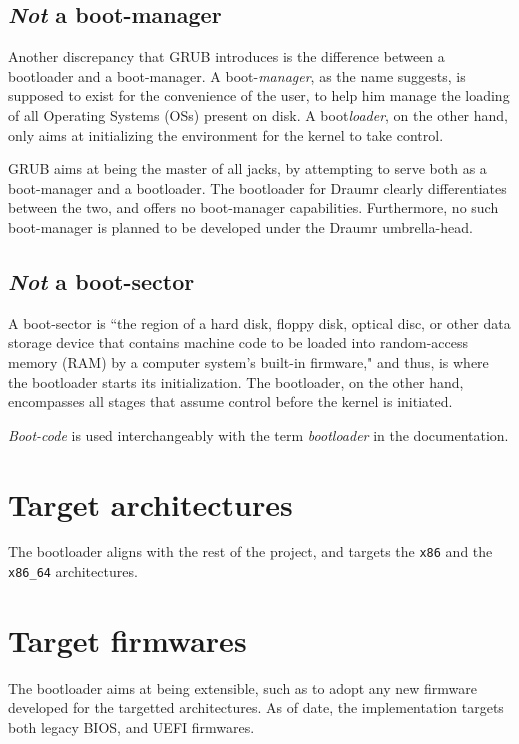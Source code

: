 \documentclass[a4paper,oneside]{memoir}
\begin{document}
\subsection{\emph{Not} a boot-manager}

Another discrepancy that GRUB introduces is the difference between a bootloader and a boot-manager. A boot-\emph{manager}, as the name suggests, is supposed to exist for the convenience of the user, to help him manage the loading of all Operating Systems (OSs) present on disk. A boot\emph{loader}, on the other hand, only aims at initializing the environment for the kernel to take control.

GRUB aims at being the master of all jacks, by attempting to serve both as a boot-manager and a bootloader. The bootloader for Draumr clearly differentiates between the two, and offers no boot-manager capabilities. Furthermore, no such boot-manager is planned to be developed under the Draumr umbrella-head.

\subsection{\emph{Not} a boot-sector}

A boot-sector is ``the region of a hard disk, floppy disk, optical disc, or other data storage device that contains machine code to be loaded into random-access memory (RAM) by a computer system's built-in firmware," and thus, is where the bootloader starts its initialization. The bootloader, on the other hand, encompasses all stages that assume control before the kernel is initiated. 

\emph{Boot-code} is used interchangeably with the term \emph{bootloader} in the documentation. 

\section{Target architectures}

The bootloader aligns with the rest of the project, and targets the \texttt{x86} and the \texttt{x86\_64} architectures.

\section{Target firmwares}

The bootloader aims at being extensible, such as to adopt any new firmware developed for the targetted architectures. As of date, the implementation targets both legacy BIOS, and UEFI firmwares.
\end{document}
